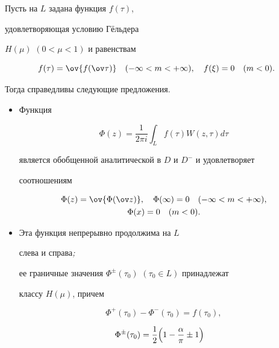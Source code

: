 \begin{thm} 


Пусть на $L$ задана функция $f(\tau)$, 


удовлетворяющая условию Г\"ельдера 


$H(\mu)$ $(0<\mu<1)$ и равенствам 


$$ 


f(\tau)=\ov{f(\ov\tau)}\quad 


(-\infty<m<+\infty),\quad f(\xi)=0\quad (m<0). 


$$ 


Тогда справедливы следующие предложения.


\begin{itemize} 


\item[1.] Функция 


\begin{equation} 


\Phi(z)=\frac{1}{2\pi i}\int_Lf(\tau)W(z,\tau)d\tau 


\end{equation} 


является обобщенной аналитической в $D$ и $D^-$ и удовлетворяет 


соотношениям 


\begin{gather*} 


\Phi(z)=\ov{\Phi(\ov z)},\quad \Phi(\infty)=0\quad 


(-\infty<m<+\infty),\\ 


\Phi(x)=0\quad (m<0). 


\end{gather*} 


\item[2.] Эта функция непрерывно продолжима на $L$ 


слева и справа{\em ;} 


ее граничные значения $\Phi^\pm(\tau_0)$ $(\tau_0\in L)$ принадлежат 


классу $H(\mu)$, причем


\begin{equation} 


\Phi^+(\tau_0)-\Phi^-(\tau_0)=f(\tau_0), 


\end{equation} 


\begin{align} 


\Phi^\pm(\tau_0)&=\frac{1}{2}\Bigl(1-\frac{\alpha}{\pi}\pm 1\Bigr) 



\end{align}
\end{itemize}
\end{thm}
